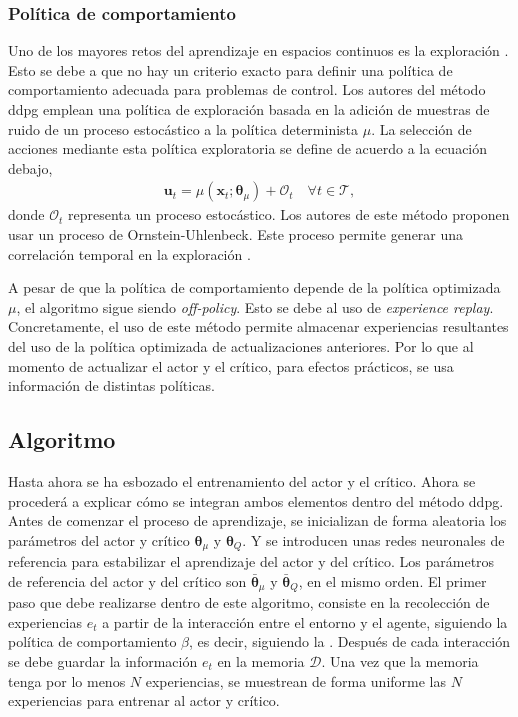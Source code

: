 \subsubsection{Política de comportamiento}

Uno de los mayores retos del aprendizaje en espacios continuos es la exploración \cite{lillicrap2015continuous}. Esto se debe a que no hay un criterio exacto para definir una política de comportamiento adecuada para problemas de control. Los autores del método \acrshort{ddpg} emplean una política de exploración basada en la adición de muestras de ruido de un proceso estocástico a la política determinista $\mu$. La selección de acciones mediante esta política exploratoria se define de acuerdo a la ecuación debajo,
\begin{align}
    \mathbf{u}_t = \mu(\mathbf{x}_t;\bm\theta_{\mu}) + \mathcal{O}_t \quad \forall t \in \mathcal{T}, \label{eq:noisy_policy}
\end{align}
donde $\mathcal{O}_t$ representa un proceso estocástico. Los autores de este método proponen usar un proceso de Ornstein-Uhlenbeck. Este proceso permite generar una correlación temporal en la exploración \cite{lillicrap2015continuous}. 

A pesar de que la política de comportamiento depende de la política optimizada $\mu$, el algoritmo sigue siendo \textit{off-policy}. Esto se debe al uso de \textit{experience replay}. Concretamente, el uso de este método permite almacenar experiencias resultantes del uso de la política optimizada de actualizaciones anteriores. Por lo que al momento de actualizar el actor y el crítico, para efectos prácticos, se usa información de distintas políticas. 

\subsection{Algoritmo}
Hasta ahora se ha esbozado el entrenamiento del actor y el crítico. Ahora se procederá a explicar cómo se integran ambos elementos dentro del método \acrshort{ddpg}. Antes de comenzar el proceso de aprendizaje, se inicializan de forma aleatoria los parámetros del actor y crítico $\bm\theta_{\mu}$ y $\bm\theta_{Q}$. Y se introducen unas redes neuronales de referencia para estabilizar el aprendizaje del actor y del crítico. Los parámetros de referencia del actor y del crítico son $\bar{\bm\theta}_{\mu}$ y $\bar{\bm\theta}_{Q}$, en el mismo orden. El primer paso que debe realizarse dentro de este algoritmo, consiste en la recolección de experiencias $e_t$ a partir de la interacción entre el entorno y el agente, siguiendo la política de comportamiento $\beta$, es decir, siguiendo la . Después de cada interacción se debe guardar la información $e_t$ en la memoria $\mathcal{D}$. Una vez que la memoria tenga por lo menos $N$ experiencias, se muestrean de forma uniforme las $N$ experiencias para entrenar al actor y crítico.


